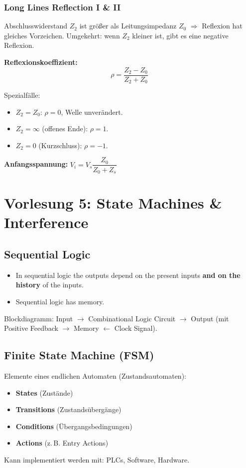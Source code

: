 \documentclass[11pt,a4paper]{article}
\begin{document}
\subsubsection{Long Lines Reflection I \& II}
Abschlusswiderstand $Z_2$ ist größer als Leitungsimpedanz $Z_0$ $\Rightarrow$ Reflexion hat gleiches Vorzeichen. Umgekehrt: wenn $Z_2$ kleiner ist, gibt es eine negative Reflexion.

\textbf{Reflexionskoeffizient:}
$$\rho = \frac{Z_2 - Z_0}{Z_2 + Z_0}$$

Spezialfälle:
\begin{itemize}
    \item $Z_2 = Z_0$: $\rho = 0$, Welle unverändert.
    \item $Z_2 = \infty$ (offenes Ende): $\rho = 1$.
    \item $Z_2 = 0$ (Kurzschluss): $\rho = -1$.
\end{itemize}

\textbf{Anfangsspannung:} $V_i = V_s \dfrac{Z_0}{Z_0 + Z_s}$

\newpage
\section{Vorlesung 5: State Machines \& Interference}

\subsection{Sequential Logic}
\begin{itemize}
    \item In sequential logic the outputs depend on the present inputs \textbf{and on the history} of the inputs.
    \item Sequential logic has memory.
\end{itemize}

Blockdiagramm: Input $\to$ Combinational Logic Circuit $\to$ Output (mit Positive Feedback $\to$ Memory $\leftarrow$ Clock Signal).

\subsection{Finite State Machine (FSM)}
Elemente eines endlichen Automaten (Zustandsautomaten):
\begin{itemize}
    \item \textbf{States} (Zustände)
    \item \textbf{Transitions} (Zustandsübergänge)
    \item \textbf{Conditions} (Übergangsbedingungen)
    \item \textbf{Actions} (z.\,B. Entry Actions)
\end{itemize}
Kann implementiert werden mit: PLCs, Software, Hardware.
\end{document}
